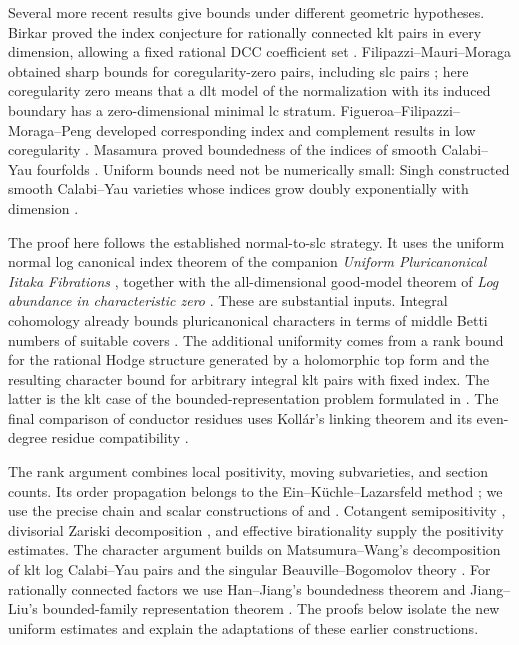 Several more recent results give bounds under different geometric
hypotheses. Birkar proved the index conjecture for rationally connected
klt pairs in every dimension, allowing a fixed rational DCC coefficient
set \citep[Corollary~1.8]{Birkar2025}.
Filipazzi--Mauri--Moraga obtained sharp bounds for coregularity-zero
pairs, including slc pairs \citep{FMM2025}; here coregularity zero means
that a dlt model of the normalization with its induced boundary has a
zero-dimensional minimal lc stratum.
Figueroa--Filipazzi--Moraga--Peng developed corresponding index
and complement results in low coregularity \citep{FFMP2025}.
Masamura proved boundedness of the indices of smooth Calabi--Yau
fourfolds \citep[Corollary~1.6]{Masamura2025}.
Uniform bounds need not be numerically small: Singh constructed smooth
Calabi--Yau varieties whose indices grow doubly exponentially with
dimension \citep{Singh2026}.

The proof here follows the established normal-to-slc strategy. It uses
the uniform normal log canonical index theorem of the companion
\emph{Uniform Pluricanonical Iitaka Fibrations}
\citep[Theorem~1.2]{UPI}, together with the all-dimensional good-model
theorem of \emph{Log abundance in characteristic zero}
\citep[Theorem~11.1]{LA}. These are substantial inputs.
Integral cohomology already bounds pluricanonical characters in terms of
middle Betti numbers of suitable covers \citep[Lemma~2.7]{JiangLiu}.
The additional uniformity comes from a rank bound for the rational Hodge
structure generated by a holomorphic top form and the resulting character
bound for arbitrary integral klt pairs with fixed index. The latter is
the klt case of the bounded-representation problem formulated in
\citet[Conjecture~1.1]{JiangLiu}. The final comparison of conductor
residues uses Koll{\'a}r's linking theorem and its even-degree residue
compatibility \citep[Theorem~10 and Proposition~14]{KollarSources}.

The rank argument combines local positivity, moving subvarieties, and
section counts. Its order propagation belongs to the
Ein--K{\"u}chle--Lazarsfeld method \citep{EKL1995}; we use the precise
chain and scalar constructions of \citet[Sections~5--6]{U4} and
\citet[Section~6]{UPI}. Cotangent semipositivity
\citep{GKP2016,CP2019}, divisorial Zariski decomposition
\citep{Nakayama2004,Boucksom2004,BFJ2009}, and effective birationality
\citep{Birkar2023} supply the positivity estimates.
The character argument builds on Matsumura--Wang's decomposition of klt
log Calabi--Yau pairs \citep{MatsumuraWang2025} and the singular
Beauville--Bogomolov theory
\citep{GKP2016,Druel2018,GGK2019,HoringPeternell2019}.
For rationally connected factors we use Han--Jiang's boundedness theorem
and Jiang--Liu's bounded-family representation theorem
\citep{HanJiang,JiangLiu}. The proofs below isolate the new uniform
estimates and explain the adaptations of these earlier constructions.
